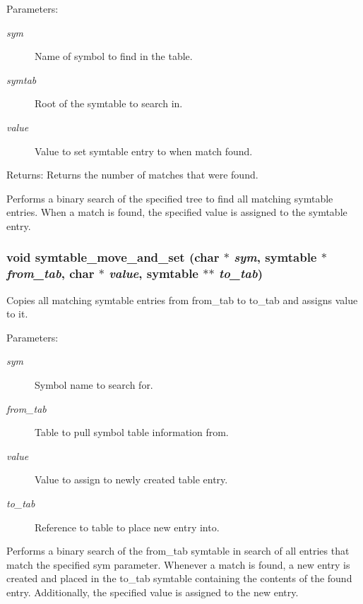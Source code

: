 \begin{Desc}
\item[Parameters:]
\begin{description}
\item[{\em sym}]Name of symbol to find in the table. \item[{\em symtab}]Root of the symtable to search in. \item[{\em value}]Value to set symtable entry to when match found.\end{description}
\end{Desc}
\begin{Desc}
\item[Returns:]Returns the number of matches that were found.\end{Desc}
Performs a binary search of the specified tree to find all matching symtable entries. When a match is found, the specified value is assigned to the symtable entry. 
\subsubsection{\setlength{\rightskip}{0pt plus 5cm}void symtable\_\-move\_\-and\_\-set (char $\ast$ {\em sym}, {\bf symtable} $\ast$ {\em from\_\-tab}, char $\ast$ {\em value}, {\bf symtable} $\ast$$\ast$ {\em to\_\-tab})}\label{symtable_8c_a2}


Copies all matching symtable entries from from\_\-tab to to\_\-tab and assigns value to it.

\begin{Desc}
\item[Parameters:]
\begin{description}
\item[{\em sym}]Symbol name to search for. \item[{\em from\_\-tab}]Table to pull symbol table information from. \item[{\em value}]Value to assign to newly created table entry. \item[{\em to\_\-tab}]Reference to table to place new entry into.\end{description}
\end{Desc}
Performs a binary search of the from\_\-tab symtable in search of all entries that match the specified sym parameter. Whenever a match is found, a new entry is created and placed in the to\_\-tab symtable containing the contents of the found entry. Additionally, the specified value is assigned to the new entry. 